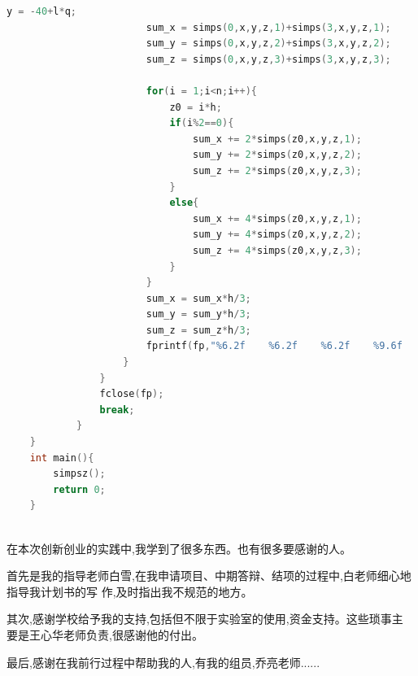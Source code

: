 \documentclass[AutoFakeBold]{LZUThesis}
\begin{document}
\begin{lstlisting}[language = C]
                        y = -40+l*q;
                        sum_x = simps(0,x,y,z,1)+simps(3,x,y,z,1);
                        sum_y = simps(0,x,y,z,2)+simps(3,x,y,z,2);
                        sum_z = simps(0,x,y,z,3)+simps(3,x,y,z,3);
    
                        for(i = 1;i<n;i++){
                            z0 = i*h;
                            if(i%2==0){
                                sum_x += 2*simps(z0,x,y,z,1);
                                sum_y += 2*simps(z0,x,y,z,2);
                                sum_z += 2*simps(z0,x,y,z,3);
                            }
                            else{
                                sum_x += 4*simps(z0,x,y,z,1);
                                sum_y += 4*simps(z0,x,y,z,2);
                                sum_z += 4*simps(z0,x,y,z,3);
                            }
                        }
                        sum_x = sum_x*h/3;
                        sum_y = sum_y*h/3;
                        sum_z = sum_z*h/3;
                        fprintf(fp,"%6.2f    %6.2f    %6.2f    %9.6f    %9.6f    %9.6f    \n",x,y,z,sum_x,sum_y,sum_z);
                    }
                }
                fclose(fp);
                break;
            }
    }
    int main(){
        simpsz();
        return 0;
    }
    
\end{lstlisting}

\Thanks

在本次创新创业的实践中,我学到了很多东西。也有很多要感谢的人。

首先是我的指导老师白雪,在我申请项目、中期答辩、结项的过程中,白老师细心地指导我计划书的写
作,及时指出我不规范的地方。

其次,感谢学校给予我的支持,包括但不限于实验室的使用,资金支持。这些琐事主
要是王心华老师负责,很感谢他的付出。

最后,感谢在我前行过程中帮助我的人,有我的组员,乔亮老师......

\end{document}
